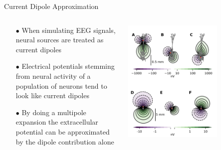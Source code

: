 \documentclass[aspectratio=169]{beamer}
\begin{document}
\begin{frame}{Current Dipole Approximation}
    \begin{columns}
        \begin{column}{0.5\textwidth}
            \begin{itemize}
              \item[$\bullet$] When simulating EEG signals, neural sources are treated as current dipoles
              \item[$\bullet$] Electrical potentials stemming from neural activity of a population of neurons tend to look like current dipoles
              \item[$\bullet$] By doing a multipole expansion the extracellular potential can be approximated by the dipole contribution alone
            \end{itemize}
        \end{column}
        \begin{column}{0.5\textwidth}
            \includegraphics[width=0.7\textwidth]{figures/dipole_pattern.png}
        \end{column}
    \end{columns}
\end{frame}
\end{document}
